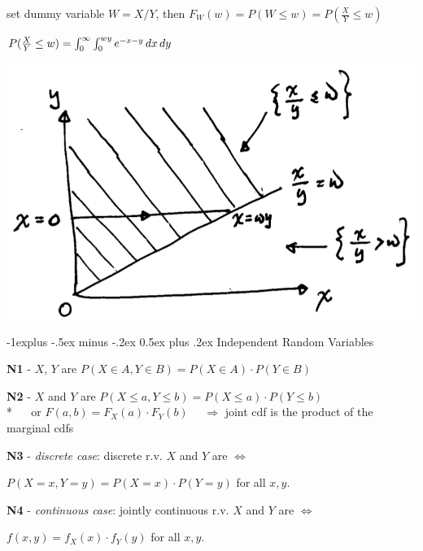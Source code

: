 \documentclass[10pt, landscape]{article}
\makeatletter
\renewcommand{\subsection}{\@startsection{subsection}{2}{0mm}%
  {-1explus -.5ex minus -.2ex}%
  {0.5ex plus .2ex}%
{\normalfont\normalsize\bfseries}}
\makeatother
\begin{document}
\begin{multicols*}{3}
\begin{minipage}[c]{0.55\linewidth}
    \begin{niceproof}[ans]
      set dummy variable $W = X/Y$, 
      then $F_W(w) = P(W \leq w) = P(\frac{X}{Y} \leq w)$

      $P(\frac{X}{Y} \leq w) = \int^\infty_0 \int^{wy}_0 e^{-x-y} \mathop{dx} \mathop{dy} $
    \end{niceproof}
  \end{minipage}
  \begin{minipage}[c]{0.4\linewidth}
    \includegraphics[width=0.95\linewidth]{st2131-double-integral-eg-3.png} 
  \end{minipage}


  \subsection{Independent Random Variables}

  \textbf{N1} - $X$, $Y$ are  $P(X \in A, Y \in B) = P(X \in A) \cdot P(Y \in B)$

  \textbf{N2} - $X$ and $Y$ are  $P(X \leq a, Y \leq b) = P(X \leq a) \cdot P(Y \leq b) $
  \\* $\quad$ or $F(a, b) = F_X(a) \cdot F_Y(b)$ $\quad \Rightarrow $ joint cdf is the product of the marginal cdfs

  \textbf{N3} - \textit{discrete case}: discrete r.v. $X$ and $Y$ are  $\iff$
  \begin{tightcenter}
    $P(X=x, Y=y) = P(X=x) \cdot P(Y=y)$ for all $x, y$.
  \end{tightcenter}

  \textbf{N4} - \textit{continuous case}: jointly continuous r.v. $X$ and $Y$ are  $\iff$
  \begin{tightcenter}
    $f(x, y) = f_X(x) \cdot f_Y(y)$ for all $x, y$.


\end{tightcenter}
\end{multicols*}
\end{document}
